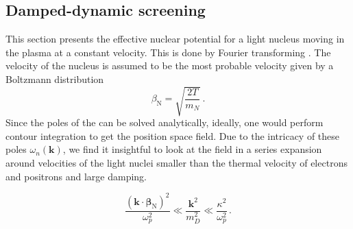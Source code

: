 \subsection{Damped-dynamic screening}\label{sec:DDS}
This section presents the effective nuclear potential for a light nucleus moving in the plasma at a constant velocity. This is done by Fourier transforming . The velocity of the nucleus is assumed to be the most probable velocity given by a Boltzmann distribution
\begin{equation}\label{eq:vel}
 \beta_{\text{N}} = \sqrt{\frac{2T}{m_N}}\,. 
\end{equation}
Since the poles of the  can be solved analytically, ideally, one would perform contour integration to get the position space field. Due to the intricacy of these poles $\omega_n(\boldsymbol{k})$, we find it insightful to look at the field in a series expansion around velocities of the light nuclei smaller than the thermal velocity of electrons and positrons and large damping.

\begin{equation}\label{eq:expansion}
\frac{(\boldsymbol{k}\cdot\boldsymbol{\beta}_{\text{N}})^2}{\omega_p^2} \ll \frac{\boldsymbol{k}^2}{m_D^2} \ll \frac{\kappa^2}{\omega_p^2}\, .
\end{equation}


